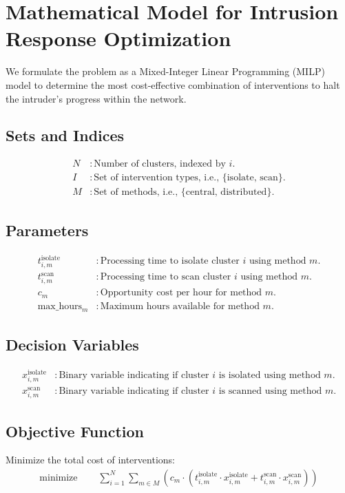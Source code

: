 \documentclass{article}
\begin{document}
\section*{Mathematical Model for Intrusion Response Optimization}

We formulate the problem as a Mixed-Integer Linear Programming (MILP) model to determine the most cost-effective combination of interventions to halt the intruder's progress within the network.

\subsection*{Sets and Indices}
\begin{align*}
N & : \text{Number of clusters, indexed by } i. \\
I & : \text{Set of intervention types, i.e., } \{ \text{isolate, scan} \}. \\
M & : \text{Set of methods, i.e., } \{ \text{central, distributed} \}.
\end{align*}

\subsection*{Parameters}
\begin{align*}
t_{i, m}^{\text{isolate}} & : \text{Processing time to isolate cluster } i \text{ using method } m. \\
t_{i, m}^{\text{scan}} & : \text{Processing time to scan cluster } i \text{ using method } m. \\
c_m & : \text{Opportunity cost per hour for method } m. \\
\text{max\_hours}_m & : \text{Maximum hours available for method } m.
\end{align*}

\subsection*{Decision Variables}
\begin{align*}
x_{i, m}^{\text{isolate}} & : \text{Binary variable indicating if cluster } i \text{ is isolated using method } m. \\
x_{i, m}^{\text{scan}} & : \text{Binary variable indicating if cluster } i \text{ is scanned using method } m.
\end{align*}

\subsection*{Objective Function}
Minimize the total cost of interventions:
\begin{align*}
\text{minimize } \quad & \sum_{i=1}^{N} \sum_{m \in M} \left( c_m \cdot \left( t_{i, m}^{\text{isolate}} \cdot x_{i, m}^{\text{isolate}} + t_{i, m}^{\text{scan}} \cdot x_{i, m}^{\text{scan}} \right) \right)
\end{align*}
\end{document}
